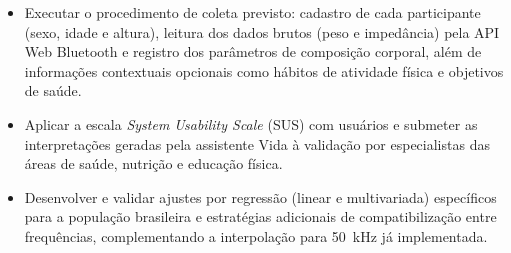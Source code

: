 \begin{itemize}
    \item Executar o procedimento de coleta previsto: cadastro de cada participante (sexo,
    idade e altura), leitura dos dados brutos (peso e impedância) pela API Web Bluetooth e
    registro dos parâmetros de composição corporal, além de informações contextuais opcionais
    como hábitos de atividade física e objetivos de saúde.

    \item Aplicar a escala \emph{System Usability Scale} (SUS) com usuários e submeter as
    interpretações geradas pela assistente Vida à validação por especialistas das áreas de
    saúde, nutrição e educação física.

    \item Desenvolver e validar ajustes por regressão (linear e multivariada) específicos
    para a população brasileira e estratégias adicionais de compatibilização entre
    frequências, complementando a interpolação para 50~kHz já implementada.
\end{itemize}
